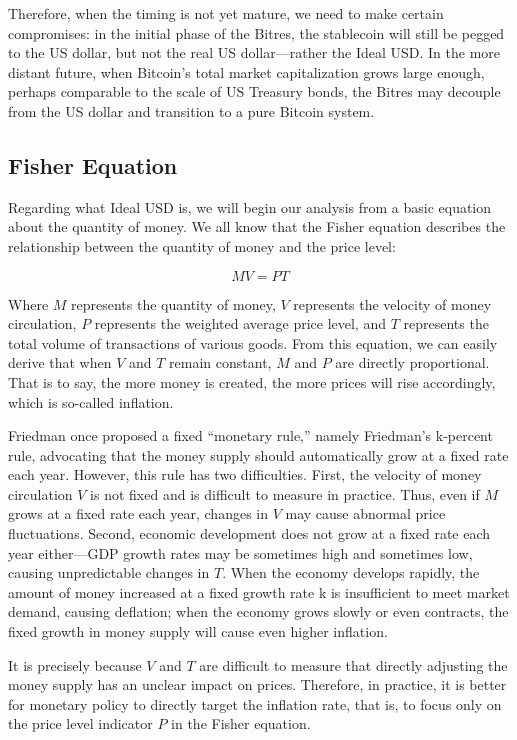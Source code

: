 \documentclass{article}
\begin{document}
Therefore, when the timing is not yet mature, we need to make certain compromises: in the initial phase of the Bitres, the stablecoin will still be pegged to the US dollar, but not the real US dollar---rather the Ideal USD. In the more distant future, when Bitcoin's total market capitalization grows large enough, perhaps comparable to the scale of US Treasury bonds, the Bitres may decouple from the US dollar and transition to a pure Bitcoin system.

\subsection{Fisher Equation}

Regarding what Ideal USD is, we will begin our analysis from a basic equation about the quantity of money. We all know that the Fisher equation describes the relationship between the quantity of money and the price level\citep{fisher1911purchasing}:

\begin{equation}
MV = PT
\end{equation}

Where $M$ represents the quantity of money, $V$ represents the velocity of money circulation, $P$ represents the weighted average price level, and $T$ represents the total volume of transactions of various goods. From this equation, we can easily derive that when $V$ and $T$ remain constant, $M$ and $P$ are directly proportional. That is to say, the more money is created, the more prices will rise accordingly, which is so-called inflation.

Friedman once proposed a fixed ``monetary rule,'' namely Friedman's k-percent rule, advocating that the money supply should automatically grow at a fixed rate each year\citep{friedman1960program}. However, this rule has two difficulties. First, the velocity of money circulation $V$ is not fixed and is difficult to measure in practice. Thus, even if $M$ grows at a fixed rate each year, changes in $V$ may cause abnormal price fluctuations. Second, economic development does not grow at a fixed rate each year either---GDP growth rates may be sometimes high and sometimes low, causing unpredictable changes in $T$. When the economy develops rapidly, the amount of money increased at a fixed growth rate k is insufficient to meet market demand, causing deflation; when the economy grows slowly or even contracts, the fixed growth in money supply will cause even higher inflation.

It is precisely because $V$ and $T$ are difficult to measure that directly adjusting the money supply has an unclear impact on prices. Therefore, in practice, it is better for monetary policy to directly target the inflation rate, that is, to focus only on the price level indicator $P$ in the Fisher equation.
\end{document}
